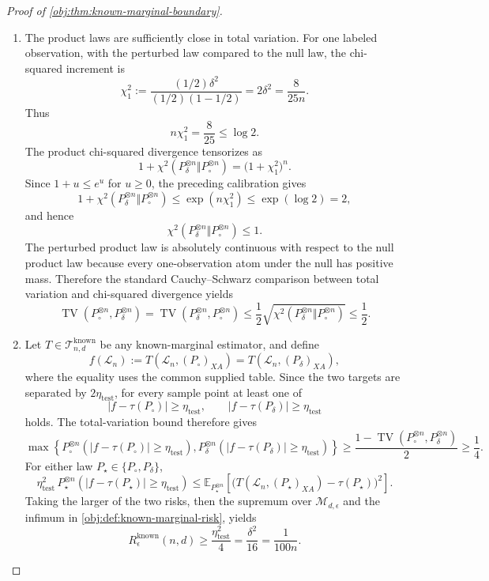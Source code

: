 \documentclass[11pt]{article}
\begin{document}
\begin{proof}[Proof of \cref{obj:thm:known-marginal-boundary}]
\begin{enumerate}
\item
The product laws are sufficiently close in total variation.  For one labeled observation, with the perturbed law compared to the null law, the chi-squared increment is
\[
\chi_1^2
:=
\frac{(1/2)\delta^2}{(1/2)(1-1/2)}
=2\delta^2
=\frac{8}{25n}.
\]
Thus
\[
n\chi_1^2=\frac{8}{25}\le \log 2 .
\]
The product chi-squared divergence tensorizes as
\[
1+\chi^2\!\left(P_{\delta}^{\otimes n}\Vert P_{\circ}^{\otimes n}\right)
=\bigl(1+\chi_1^2\bigr)^n .
\]
Since \(1+u\le e^u\) for \(u\ge0\), the preceding calibration gives
\[
1+\chi^2\!\left(P_{\delta}^{\otimes n}\Vert P_{\circ}^{\otimes n}\right)
\le
\exp(n\chi_1^2)
\le
\exp(\log 2)=2,
\]
and hence
\[
\chi^2\!\left(P_{\delta}^{\otimes n}\Vert P_{\circ}^{\otimes n}\right)
\le 1.
\]
The perturbed product law is absolutely continuous with respect to the null product law because every one-observation atom under the null has positive mass.  Therefore the standard Cauchy--Schwarz comparison between total variation and chi-squared divergence yields
\[
\operatorname{TV}\!\left(P_{\circ}^{\otimes n},P_{\delta}^{\otimes n}\right)
=
\operatorname{TV}\!\left(P_{\delta}^{\otimes n},P_{\circ}^{\otimes n}\right)
\le
\frac12
\sqrt{\chi^2\!\left(P_{\delta}^{\otimes n}\Vert P_{\circ}^{\otimes n}\right)}
\le \frac12 .
\]

\item
Let \(T\in\mathcal T^{\mathrm{known}}_{n,d}\) be any known-marginal estimator, and define
\[
f(\mathcal L_n):=
T\!\left(\mathcal L_n,(P_{\circ})_{XA}\right)
=
T\!\left(\mathcal L_n,(P_{\delta})_{XA}\right),
\]
where the equality uses the common supplied table.  Since the two targets are separated by \(2\eta_{\mathrm{test}}\), for every sample point at least one of
\[
\bigl|f-\tau(P_{\circ})\bigr|\ge \eta_{\mathrm{test}},
\qquad
\bigl|f-\tau(P_{\delta})\bigr|\ge \eta_{\mathrm{test}}
\]
holds.  The total-variation bound therefore gives
\[
\max\!\left\{
P_{\circ}^{\otimes n}\!\left(\bigl|f-\tau(P_{\circ})\bigr|\ge \eta_{\mathrm{test}}\right),
P_{\delta}^{\otimes n}\!\left(\bigl|f-\tau(P_{\delta})\bigr|\ge \eta_{\mathrm{test}}\right)
\right\}
\ge \frac{1-\operatorname{TV}(P_{\circ}^{\otimes n},P_{\delta}^{\otimes n})}{2}
\ge \frac14 .
\]
For either law \(P_\star\in\{P_{\circ},P_{\delta}\}\),
\[
\eta_{\mathrm{test}}^2\,
P_\star^{\otimes n}\!\left(\bigl|f-\tau(P_\star)\bigr|\ge \eta_{\mathrm{test}}\right)
\le
\mathbb E_{P_\star^{\otimes n}}
\!\left[\bigl(T(\mathcal L_n,(P_\star)_{XA})-\tau(P_\star)\bigr)^2\right].
\]
Taking the larger of the two risks, then the supremum over \(\mathcal M_{d,\epsilon}\) and the infimum in \cref{obj:def:known-marginal-risk}, yields
\[
R_\epsilon^{\mathrm{known}}(n,d)
\ge
\frac{\eta_{\mathrm{test}}^2}{4}
=
\frac{\delta^2}{16}
=
\frac{1}{100n}.
\]


\end{enumerate}
\end{proof}
\end{document}
